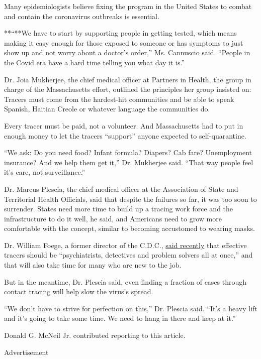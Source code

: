 Many epidemiologists believe fixing the program in the United States to
combat and contain the coronavirus outbreaks is essential.

**``**We have to start by supporting people in getting tested, which
means making it easy enough for those exposed to someone or has symptoms
to just show up and not worry about a doctor's order,'' Ms. Cannuscio
said. ``People in the Covid era have a hard time telling you what day it
is.''

Dr. Joia Mukherjee, the chief medical officer at Partners in Health, the
group in charge of the Massachusetts effort, outlined the principles her
group insisted on: Tracers must come from the hardest-hit communities
and be able to speak Spanish, Haitian Creole or whatever language the
communities do.

Every tracer must be paid, not a volunteer. And Massachusetts had to put
in enough money to let the tracers ``support'' anyone expected to
self-quarantine.

``We ask: Do you need food? Infant formula? Diapers? Cab fare?
Unemployment insurance? And we help them get it,'' Dr. Mukherjee said.
``That way people feel it's care, not surveillance.''

Dr. Marcus Plescia, the chief medical officer at the Association of
State and Territorial Health Officials, said that despite the failures
so far, it was too soon to surrender. States need more time to build up
a tracing work force and the infrastructure to do it well, he said, and
Americans need to grow more comfortable with the concept, similar to
becoming accustomed to wearing masks.

Dr. William Foege, a former director of the C.D.C.,
\href{https://www.nytimes3xbfgragh.onion/2020/05/23/sunday-review/coronavirus-contact-tracing.html}{said
recently} that effective tracers should be ``psychiatrists, detectives
and problem solvers all at once,'' and that will also take time for many
who are new to the job.

But in the meantime, Dr. Plescia said, even finding a fraction of cases
through contact tracing will help slow the virus's spread.

``We don't have to strive for perfection on this,'' Dr. Plescia said.
``It's a heavy lift and it's going to take some time. We need to hang in
there and keep at it.''

Donald G. McNeil Jr. contributed reporting to this article.

Advertisement

